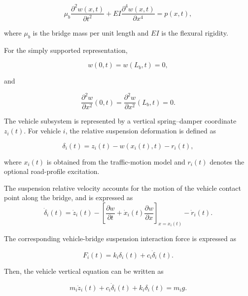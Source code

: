 \documentclass[journal]{IEEEtran}
\begin{document}
\begin{equation}
\mu_b
\frac{\partial^2 w(x,t)}{\partial t^2}
+
EI
\frac{\partial^4 w(x,t)}{\partial x^4}
=
p(x,t),
\end{equation}

where $\mu_b$ is the bridge mass per unit length and $EI$ is the flexural rigidity.

For the simply supported representation,

\begin{equation}
w(0,t)=w(L_b,t)=0,
\end{equation}

and

\begin{equation}
\frac{\partial^2 w}{\partial x^2}(0,t)
=
\frac{\partial^2 w}{\partial x^2}(L_b,t)
=
0.
\end{equation}

The vehicle subsystem is represented by a vertical spring--damper
coordinate $z_i(t)$. For vehicle $i$, the relative suspension deformation is defined as

\begin{equation}
\delta_i(t)
=
z_i(t)
-
w\!\left(x_i(t),t\right)
-
r_i(t),
\end{equation}

where $x_i(t)$ is obtained from the traffic-motion model and $r_i(t)$ denotes the optional road-profile excitation.



The suspension relative velocity accounts for the
motion of the vehicle contact point along the bridge,
and is expressed as
\begin{equation}
\dot{\delta}_i(t)
=
\dot{z}_i(t)
-
\left[
\frac{\partial w}{\partial t}
+
\dot{x}_i(t)\frac{\partial w}{\partial x}
\right]_{x=x_i(t)}
-
\dot{r}_i(t).
\label{eq:relative_velocity}
\end{equation}




The corresponding vehicle-bridge suspension interaction force is expressed as


\begin{equation}
F_i(t)
=
k_i \delta_i(t)
+
c_i \dot{\delta}_i(t).
\end{equation}

Then, the vehicle vertical equation can be written as


\begin{equation}
m_i\ddot{z}_i(t)
+
c_i\dot{\delta}_i(t)
+
k_i\delta_i(t)
=
m_i g.
\label{eq:vehicle_motion_gravity}
\end{equation}
\end{document}
